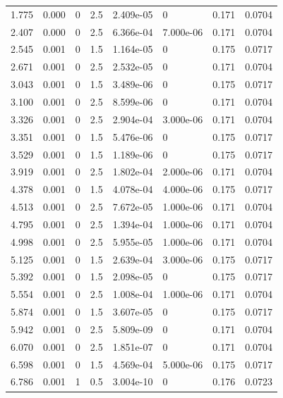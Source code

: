\documentclass[preview]{standalone}
\begin{document}
{{\begin{tabular}{L{1.2cm}C{1.2cm} C{0.3cm}C{0.5cm} C{1.4cm}C{1.4cm} C{1.4cm}C{1.4cm}}
  1.775  &  0.000  & 0     & 2.5 &  2.409e-05  & 0  & 0.171 &  0.0704   \\ 
  2.407  &  0.000  & 0     & 2.5 &  6.366e-04  & 7.000e-06  & 0.171 &  0.0704   \\ 
  2.545  &  0.001  & 0     & 1.5 &  1.164e-05  & 0  & 0.175 &  0.0717   \\ 
  2.671  &  0.001  & 0     & 2.5 &  2.532e-05  & 0  & 0.171 &  0.0704   \\ 
  3.043  &  0.001  & 0     & 1.5 &  3.489e-06  & 0  & 0.175 &  0.0717   \\ 
  3.100  &  0.001  & 0     & 2.5 &  8.599e-06  & 0  & 0.171 &  0.0704   \\ 
  3.326  &  0.001  & 0     & 2.5 &  2.904e-04  & 3.000e-06  & 0.171 &  0.0704   \\ 
  3.351  &  0.001  & 0     & 1.5 &  5.476e-06  & 0  & 0.175 &  0.0717   \\ 
  3.529  &  0.001  & 0     & 1.5 &  1.189e-06  & 0  & 0.175 &  0.0717   \\ 
  3.919  &  0.001  & 0     & 2.5 &  1.802e-04  & 2.000e-06  & 0.171 &  0.0704   \\ 
  4.378  &  0.001  & 0     & 1.5 &  4.078e-04  & 4.000e-06  & 0.175 &  0.0717   \\ 
  4.513  &  0.001  & 0     & 2.5 &  7.672e-05  & 1.000e-06  & 0.171 &  0.0704   \\ 
  4.795  &  0.001  & 0     & 2.5 &  1.394e-04  & 1.000e-06  & 0.171 &  0.0704   \\ 
  4.998  &  0.001  & 0     & 2.5 &  5.955e-05  & 1.000e-06  & 0.171 &  0.0704   \\ 
  5.125  &  0.001  & 0     & 1.5 &  2.639e-04  & 3.000e-06  & 0.175 &  0.0717   \\ 
  5.392  &  0.001  & 0     & 1.5 &  2.098e-05  & 0  & 0.175 &  0.0717   \\ 
  5.554  &  0.001  & 0     & 2.5 &  1.008e-04  & 1.000e-06  & 0.171 &  0.0704   \\ 
  5.874  &  0.001  & 0     & 1.5 &  3.607e-05  & 0  & 0.175 &  0.0717   \\ 
  5.942  &  0.001  & 0     & 2.5 &  5.809e-09  & 0  & 0.171 &  0.0704   \\ 
  6.070  &  0.001  & 0     & 2.5 &  1.851e-07  & 0  & 0.171 &  0.0704   \\ 
  6.598  &  0.001  & 0     & 1.5 &  4.569e-04  & 5.000e-06  & 0.175 &  0.0717   \\ 
  6.786  &  0.001  & 1     & 0.5 &  3.004e-10  & 0  & 0.176 &  0.0723   \\ 

\end{tabular}}}
\end{document}
